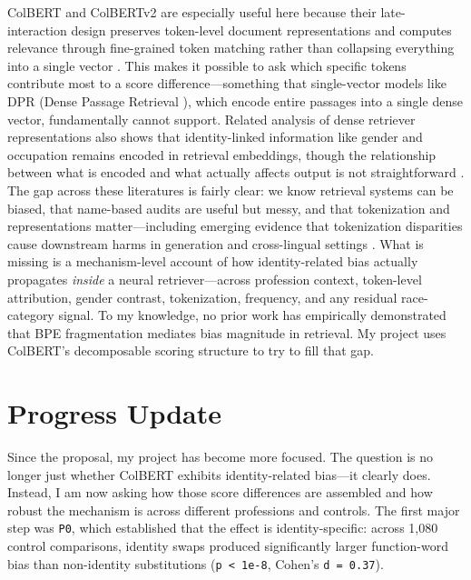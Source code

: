 \documentclass[acmsmall,screen,review]{acmart}
\begin{document}
ColBERT and ColBERTv2 are especially useful here because their late-interaction design preserves token-level document representations and computes relevance through fine-grained token matching rather than collapsing everything into a single vector \cite{khattab2020,santhanam2022}. This makes it possible to ask which specific tokens contribute most to a score difference---something that single-vector models like DPR (Dense Passage Retrieval \cite{karpukhin2020}), which encode entire passages into a single dense vector, fundamentally cannot support. Related analysis of dense retriever representations also shows that identity-linked information like gender and occupation remains encoded in retrieval embeddings, though the relationship between what is encoded and what actually affects output is not straightforward \cite{goldfarb2024}. The gap across these literatures is fairly clear: we know retrieval systems can be biased, that name-based audits are useful but messy, and that tokenization and representations matter---including emerging evidence that tokenization disparities cause downstream harms in generation \cite{ovalle2024} and cross-lingual settings \cite{petrov2023}. What is missing is a mechanism-level account of how identity-related bias actually propagates \emph{inside} a neural retriever---across profession context, token-level attribution, gender contrast, tokenization, frequency, and any residual race-category signal. To my knowledge, no prior work has empirically demonstrated that BPE fragmentation mediates bias magnitude in retrieval. My project uses ColBERT's decomposable scoring structure to try to fill that gap.

\section{Progress Update}

Since the proposal, my project has become more focused. The question is no longer just whether ColBERT exhibits identity-related bias---it clearly does. Instead, I am now asking how those score differences are assembled and how robust the mechanism is across different professions and controls. The first major step was \texttt{P0}, which established that the effect is identity-specific: across 1,080 control comparisons, identity swaps produced significantly larger function-word bias than non-identity substitutions (\texttt{p < 1e-8}, Cohen's \texttt{d = 0.37}).
\end{document}
